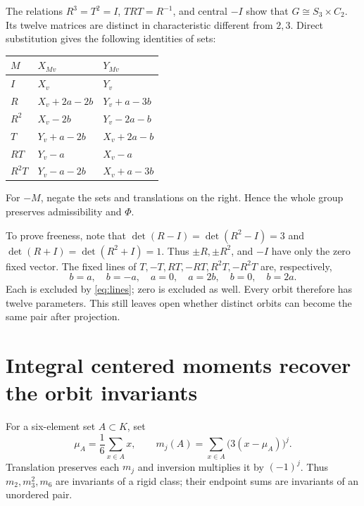 \documentclass[11pt]{article}
\begin{document}
The relations $R^3=T^2=I$, $TRT=R^{-1}$, and central $-I$ show
that $G\cong S_3\times C_2$. Its twelve matrices are distinct in
characteristic different from $2,3$. Direct substitution gives the
following identities of sets:
\begin{center}
\begin{tabular}{@{}lll@{}}\toprule
$M$ & $X_{Mv}$ & $Y_{Mv}$\\\midrule
$I$ & $X_v$ & $Y_v$\\
$R$ & $X_v+2a-2b$ & $Y_v+a-3b$\\
$R^2$ & $X_v-2b$ & $Y_v-2a-b$\\
$T$ & $Y_v+a-2b$ & $X_v+2a-b$\\
$RT$ & $Y_v-a$ & $X_v-a$\\
$R^2T$ & $Y_v-a-2b$ & $X_v+a-3b$\\\bottomrule
\end{tabular}
\end{center}
For $-M$, negate the sets and translations on the right. Hence the
whole group preserves admissibility and $\Phi$.

To prove freeness, note that $\det(R-I)=\det(R^2-I)=3$ and
$\det(R+I)=\det(R^2+I)=1$. Thus $\pm R,\pm R^2$, and $-I$
have only the zero fixed vector. The fixed lines of
$T,-T,RT,-RT,R^2T,-R^2T$ are, respectively,
\[
 b=a,\quad b=-a,\quad a=0,\quad a=2b,\quad b=0,\quad b=2a.
\]
Each is excluded by \eqref{eq:lines}; zero is excluded as well.
Every orbit therefore has twelve parameters. This still leaves open
whether distinct orbits can become the same pair after projection.

\newpage
\section{Integral centered moments recover the orbit invariants}\label{sec:moments}
For a six-element set $A\subset K$, set
\[
 \mu_A=\frac16\sum_{x\in A}x,\qquad
 m_j(A)=\sum_{x\in A}\bigl(3(x-\mu_A)\bigr)^j.
\]
Translation preserves each $m_j$ and inversion multiplies it by
$(-1)^j$. Thus $m_2,m_3^2,m_6$ are invariants of a rigid class;
their endpoint sums are invariants of an unordered pair.
\end{document}
